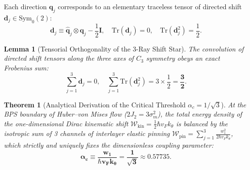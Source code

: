 \documentclass[12pt,a4paper]{article}
\newtheorem{theorem}{Theorem}
\newtheorem{lemma}{Lemma}
\begin{document}
	Each direction $\mathbf{q}_j$ corresponds to an elementary traceless tensor of directed shift $\mathbf{d}_j \in \mathrm{Sym}_0(2)$:
	\begin{equation}
		\mathbf{d}_j \equiv \hat{\mathbf{q}}_j \otimes \hat{\mathbf{q}}_j - \frac{1}{2}\mathbf{I}, \quad \mathrm{Tr}(\mathbf{d}_j) = 0, \quad \mathrm{Tr}(\mathbf{d}_j^2) = \frac{1}{2}.
	\end{equation}
	
	\begin{lemma}[Tensorial Orthogonality of the 3-Ray Shift Star]
		The convolution of directed shift tensors along the three axes of $C_3$ symmetry obeys an exact Frobenius sum:
	\begin{equation}
			\sum_{j=1}^3 \mathbf{d}_j = 0, \quad \sum_{j=1}^3 \mathrm{Tr}(\mathbf{d}_j^2) = 3 \times \frac{1}{2} = \mathbf{\frac{3}{2}}.
	\end{equation}	
	\end{lemma}
		
	\begin{theorem}[Analytical Derivation of the Critical Threshold $\alpha_c = 1/\sqrt{3}$]
	At the BPS boundary of Huber--von Mises flow ($2J_2 = 3\sigma_m^2$), the total energy density of the one-dimensional Dirac kinematic shift $\mathcal{W}_{\mathrm{kin}} = \frac{1}{2} \hbar v_F k_\theta$ is balanced by the isotropic sum of 3 channels of interlayer elastic pinning $\mathcal{W}_{\mathrm{pin}} = \sum_{j=1}^3 \frac{w_1^2}{2 \hbar v_F k_\theta}$, which strictly and uniquely fixes the dimensionless coupling parameter:
	\begin{equation}
	\mathbf{\alpha_c \equiv \frac{w_1}{\hbar v_F k_\theta} = \frac{1}{\sqrt{3}} \approx 0.57735}.
	\end{equation}
	\end{theorem}
		
\end{document}
